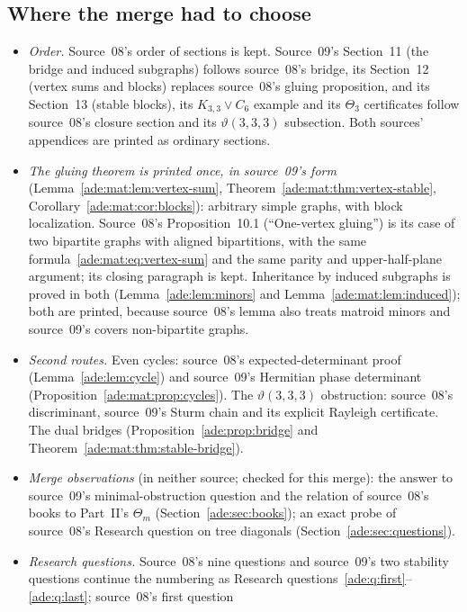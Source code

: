 \documentclass[11pt]{article}
\numberwithin{equation}{section}
\theoremstyle{definition}
\begin{document}
\subsection{Where the merge had to choose}
\label{ade:sec:merge}
\begin{itemize}[leftmargin=1.4em]
\item \emph{Order.} Source~08's order of sections is kept. Source~09's
Section~11 (the bridge and induced subgraphs) follows source~08's bridge,
its Section~12 (vertex sums and blocks) replaces source~08's gluing
proposition, and its Section~13 (stable blocks), its $K_{3,3}\vee C_6$
example and its $\Theta_3$ certificates follow source~08's closure section
and its $\vartheta(3,3,3)$ subsection. Both sources' appendices are printed
as ordinary sections.
\item \emph{The gluing theorem is printed once, in source~09's form}
(Lemma~\ref{ade:mat:lem:vertex-sum}, Theorem~\ref{ade:mat:thm:vertex-stable},
Corollary~\ref{ade:mat:cor:blocks}): arbitrary simple graphs, with block
localization. Source~08's Proposition~10.1 (``One-vertex gluing'') is its
case of two bipartite graphs with aligned bipartitions, with the same
formula~\eqref{ade:mat:eq:vertex-sum} and the same parity and
upper-half-plane argument; its closing paragraph is kept. Inheritance by
induced subgraphs is proved in both (Lemma~\ref{ade:lem:minors} and
Lemma~\ref{ade:mat:lem:induced}); both are printed, because source~08's lemma
also treats matroid minors and source~09's covers non-bipartite graphs.
\item \emph{Second routes.} Even cycles: source~08's expected-determinant
proof (Lemma~\ref{ade:lem:cycle}) and source~09's Hermitian phase
determinant (Proposition~\ref{ade:mat:prop:cycles}). The
$\vartheta(3,3,3)$ obstruction: source~08's discriminant, source~09's Sturm
chain and its explicit Rayleigh certificate. The dual bridges
(Proposition~\ref{ade:prop:bridge} and
Theorem~\ref{ade:mat:thm:stable-bridge}).
\item \emph{Merge observations} (in neither source; checked for this merge):
the answer to source~09's minimal-obstruction question and the relation of
source~08's books to Part~II's $\Theta_m$ (Section~\ref{ade:sec:books}); an
exact probe of source~08's Research question on tree diagonals
(Section~\ref{ade:sec:questions}).
\item \emph{Research questions.} Source~08's nine questions and source~09's
two stability questions continue the numbering as Research
questions~\ref{ade:q:first}--\ref{ade:q:last}; source~08's first question

\end{itemize}
\end{document}

